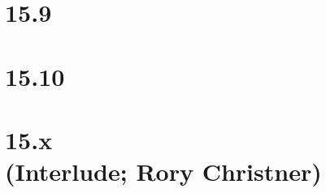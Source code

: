  \chapter{15.9}
 \chapter{15.10}
 \chapter[15.x (Interlude; Rory Christner)]{15.x\\(Interlude; Rory Christner)}















